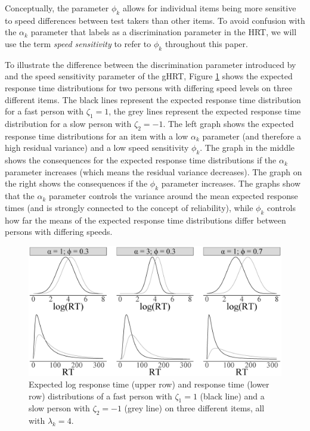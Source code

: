\documentclass[a4paper,man,apacite,donotrepeattitle]{apa6}
\begin{document}
Conceptually, the parameter $\phi_{k}$ allows for individual items being more sensitive to speed differences between test takers than other items. To avoid confusion with the $\alpha_k$ parameter that   labels as a discrimination parameter in the HRT, we will use the term \textit{speed sensitivity} to refer to $\phi_{k}$ throughout this paper. 

To illustrate the difference between the discrimination parameter introduced by  and the speed sensitivity parameter of the gHRT, Figure \ref{fig:discr_diff} shows the  expected response time distributions for two persons with differing speed levels on three different items. The black lines represent the expected response time distribution for a fast person with $\zeta_1 = 1$, the grey lines represent the expected response time distribution for a slow person with $\zeta_2 = -1$. The left graph shows the expected response time distributions for an item with a low $\alpha_k$ parameter (and therefore a high residual variance) and a low speed sensitivity $\phi_k$. The graph in the middle shows the consequences for the expected response time distributions if the $\alpha_k$ parameter increases (which means the residual variance decreases). The graph on the right shows the consequences if the $\phi_k$ parameter  increases. The graphs show that the $\alpha_k$ parameter controls the variance around the mean expected response times (and is strongly connected to the concept of reliability), while $\phi_k$ controls how far the means of the expected response time distributions differ between persons with differing speeds.

\begin{figure}
	\begin{center}
	 \includegraphics[height = 0.30\textheight]{discrimination_comp.eps}
	\end{center}		
	 \caption{Expected log response time (upper row) and response time (lower row) distributions of a fast person with $\zeta_1 = 1$ (black line) and a slow person with $\zeta_2 = -1$ (grey line) on three different items, all with $\lambda_k = 4$.} 
	 \label{fig:discr_diff}
\end{figure}
\end{document}
